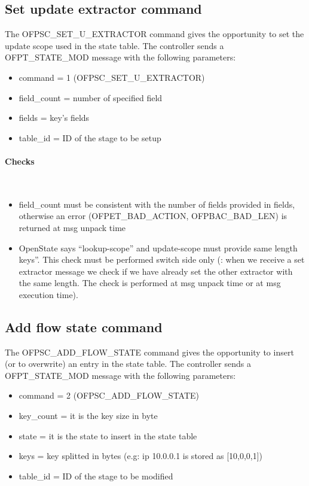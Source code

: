 \subsection{Set update extractor command}
\label{subsec:set_u_extr}
The OFPSC\_SET\_U\_EXTRACTOR command gives the opportunity to set the update scope used in the state table.
The controller sends a OFPT\_STATE\_MOD message with the following parameters:

\begin{itemize}
\setlength\itemsep{0em}
\item command = 1 (OFPSC\_SET\_U\_EXTRACTOR)
\item field\_count = number of specified field 
\item fields = key’s fields
\item table\_id = ID of the stage to be setup
\end{itemize}


\paragraph{Checks}\mbox{}\\
\begin{itemize}
\setlength\itemsep{0em}
\item field\_count must be consistent with the number of fields provided in fields, otherwise an error (OFPET\_BAD\_ACTION, OFPBAC\_BAD\_LEN) is returned at msg unpack time
\item OpenState says ``lookup-scope'' and update-scope must provide same length keys”. This check must be performed switch side only (: when we receive a set extractor message we check if we have already set the other extractor with the same length. The check is performed at msg unpack time or at msg execution time).
\end{itemize}

\subsection{Add flow state command}
\label{subsec:add_flow}
The OFPSC\_ADD\_FLOW\_STATE command gives the opportunity to insert (or to overwrite) an entry in the state table.
The controller sends a OFPT\_STATE\_MOD message with the following parameters:
\begin{itemize}
\setlength\itemsep{0em}
\item command = 2 (OFPSC\_ADD\_FLOW\_STATE)
\item key\_count = it is the key size in byte
\item state = it is the state to insert in the state table
\item keys = key splitted in bytes (e.g: ip 10.0.0.1 is stored as [10,0,0,1])
\item table\_id = ID of the stage to be modified
\end{itemize}

